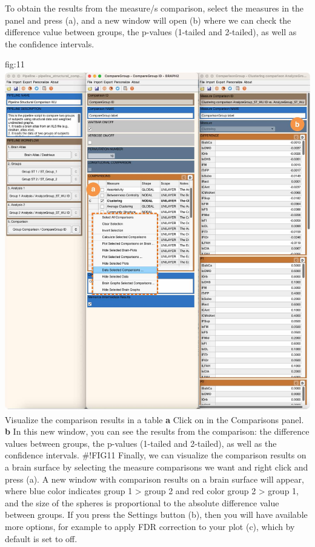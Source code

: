 \documentclass[justified]{tufte-handout}
\begin{document}
To obtain the results from the measure/s comparison, select the measures in the  panel and press ({a}), and a new window will open ({b}) where we can check the difference value between groups, the p-values (1-tailed and 2-tailed), as well as the confidence intervals.

{fig:11}
{\includegraphics{fig11.jpg}
}
{Visualize the comparison results in a table}
{
	{\bf a} Click on  in the Comparisons panel.
	{\bf b} In this new window, you can see the results from the comparison: the difference values between groups, the p-values (1-tailed and 2-tailed), as well as the confidence intervals.
}
#!FIG11
Finally, we can visualize the comparison results on a brain surface by selecting the measure comparisons we want and right click and press  ({a}). A new window with comparison results on a brain surface will appear, where blue color indicates group 1 > group 2 and red color group 2 > group 1, and the size of the spheres is proportional to the absolute difference value between groups. If you press the Settings button ({b}), then you will have available more options, for example to apply FDR correction to your plot ({c}), which by default is set to off.
\end{document}
